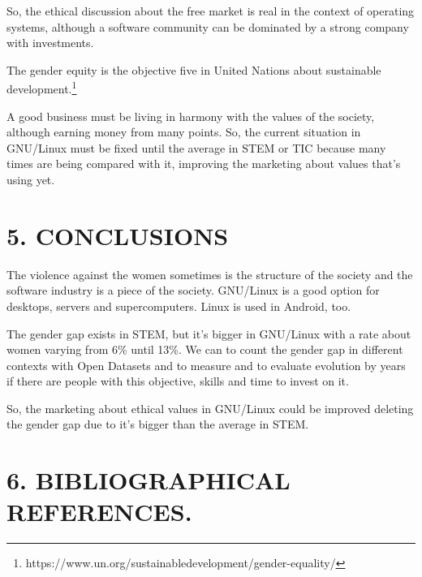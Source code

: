 \documentclass[fleqn,10pt,lineno]{wlpeerj} %
\begin{document}
So, the ethical discussion about the free market is real in the
context of operating systems, although a software community can be
dominated by a strong company with investments.

The gender equity is the objective five in United Nations about
sustainable
development.\footnote{https://www.un.org/sustainabledevelopment/gender-equality/}

A good business must be living in harmony
with the values of the society, although earning money from many
points. So, the current situation in GNU/Linux must be fixed until the
average in STEM or TIC because many times are being compared with it,
improving the marketing about values that's using yet.

\section*{5. CONCLUSIONS}

The violence against the women sometimes is the structure of the
society and the software industry is a piece of the society. GNU/Linux
is a good option for desktops, servers and supercomputers. Linux is
used in Android, too.

The gender gap exists in STEM, but it's bigger in GNU/Linux with a
rate about women varying from 6\% until 13\%. We can to count the
gender gap in different contexts with Open Datasets and to measure and
to evaluate evolution by years if there are people with this
objective, skills and time to invest on it.

So, the marketing about ethical values in GNU/Linux could be improved
deleting the gender gap due to it's bigger than the average in STEM.

\section*{6. BIBLIOGRAPHICAL REFERENCES.}


\end{document}
